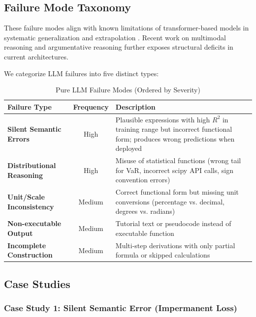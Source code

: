 \documentclass[twoside,11pt]{article}
\begin{document}
\subsection{Failure Mode Taxonomy}

These failure modes align with known limitations of transformer-based models in systematic generalization \citep{lake2017building} and extrapolation \citep{zhang2024extrapolation}. Recent work on multimodal reasoning \citep{malkinski2025multimodal} and argumentative reasoning \citep{gould2025argumentative} further exposes structural deficits in current architectures.

We categorize LLM failures into five distinct types:\citep{kambhampati2024llms}

\begin{table}[htbp]
\centering
\caption{Pure LLM Failure Modes (Ordered by Severity)}
\label{tab:failure_modes}
\begin{tabular}{@{}lcp{7cm}@{}}
\toprule
\textbf{Failure Type} & \textbf{Frequency} & \textbf{Description} \\
\midrule
\textbf{Silent Semantic Errors} & High & Plausible expressions with high $R^2$ in training range but incorrect functional form; produces wrong predictions when deployed \\
\midrule
\textbf{Distributional Reasoning} & High & Misuse of statistical functions (wrong tail for VaR, incorrect scipy API calls, sign convention errors) \\\citep{lewkowycz2022minerva}
\midrule
\textbf{Unit/Scale Inconsistency} & Medium & Correct functional form but missing unit conversions (percentage vs. decimal, degrees vs. radians) \\
\midrule
\textbf{Non-executable Output} & Medium & Tutorial text or pseudocode instead of executable function \\
\midrule
\textbf{Incomplete Construction} & Medium & Multi-step derivations with only partial formula or skipped calculations \\
\bottomrule
\end{tabular}
\end{table}

\subsection{Case Studies}

\subsubsection{Case Study 1: Silent Semantic Error (Impermanent Loss)}
\end{document}
